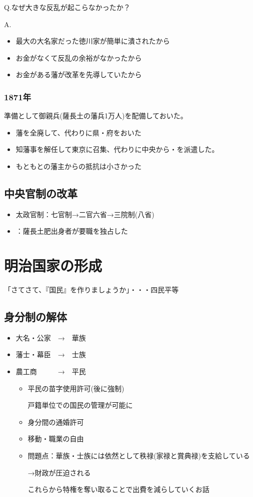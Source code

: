 \documentclass[12pt,fleqn]{ltjsarticle}
\begin{document}
Q.なぜ大きな反乱が起こらなかったか？

A.
\begin{itemize}
\item 最大の大名家だった徳川家が簡単に潰されたから
\item お金がなくて反乱の余裕がなかったから
\item お金がある藩が改革を先導していたから
\end{itemize}

\subsubsection*{1871年 }
準備として御親兵(薩長土の藩兵1万人)を配備しておいた。
\begin{itemize}
\item 藩を全廃して、代わりに県・府をおいた
\item 知藩事を解任して東京に召集、代わりに中央から・を派遣した。
\item もともとの藩主からの抵抗は小さかった
\end{itemize}
\subsection{中央官制の改革}
\begin{itemize}
\item 太政官制：七官制→二官六省→三院制(八省)
\item {}：薩長土肥出身者が要職を独占した
\end{itemize}

\section{明治国家の形成}
「さてさて、『国民』を作りましょうか」・・・四民平等
\subsection{身分制の解体}
\begin{itemize}
\item 大名・公家　→　華族
\item 藩士・幕臣　→　士族
\item 農工商　　　→　平民

\begin{itemize}
\item 平民の苗字使用許可(後に強制)

戸籍単位での国民の管理が可能に
\item 身分間の通婚許可
\item 移動・職業の自由
\item 問題点：華族・士族には依然として秩禄(家禄と賞典禄)を支給している

→財政が圧迫される

これらから特権を奪い取ることで出費を減らしていくお話
\end{itemize}
\end{itemize}
\end{document}
